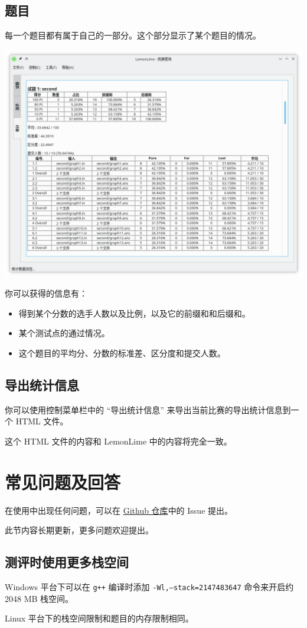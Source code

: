 \documentclass[UTF-8]{ctexart}
\begin{document}
		
		\subsection{题目}
		
			每一个题目都有属于自己的一部分。这个部分显示了某个题目的情况。
			
			\begin{center}
			\includegraphics[scale=0.5]{pics/statistics2.png}
			\end{center}
		
			你可以获得的信息有：
		
			\begin{itemize}
				\item 得到某个分数的选手人数以及比例，以及它的前缀和和后缀和。
				\item 某个测试点的通过情况。
				\item 这个题目的平均分、分数的标准差、区分度和提交人数。
			\end{itemize}
		
		\subsection{导出统计信息}
	
			你可以使用控制菜单栏中的 “导出统计信息” 来导出当前比赛的导出统计信息到一个 HTML 文件。
			
			这个 HTML 文件的内容和 LemonLime 中的内容将完全一致。
	
	\newpage

	\section{常见问题及回答}
	
		在使用中出现任何问题，可以在 \href{https://github.com/iotang/Project_LemonLime}{Github 仓库}中的 Issue 提出。
		
		此节内容长期更新，更多问题欢迎提出。
		
		\subsection{测评时使用更多栈空间}
		
			Windows 平台下可以在 \texttt{g++} 编译时添加 \texttt{-Wl,--stack=2147483647} 命令来开启约 2048 MB 栈空间。
			
			Linux 平台下的栈空间限制和题目的内存限制相同。
			
	\newpage
			
\end{document}
